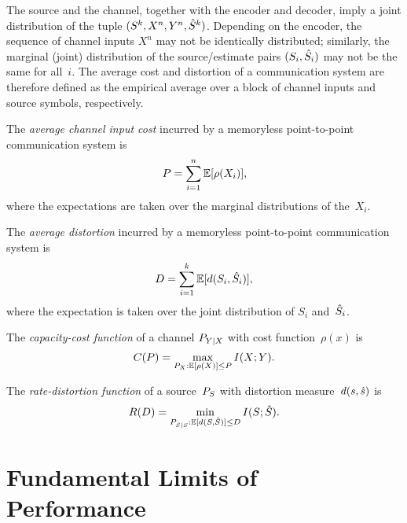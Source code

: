 The source and the channel, together with the encoder and decoder, imply a joint
distribution of the tuple $(S^k, X^n, Y^n, {\hat{S}}^k)$.  Depending on the encoder,
the sequence of channel inputs $X^n$ may not be identically distributed;
similarly, the marginal (joint) distribution of the source/estimate pairs
$(S_i,{\hat{S}}_i)$ may not be the same for all~$i$. The average cost and distortion
of a communication system are therefore defined as the empirical average over
a block of channel inputs and source symbols, respectively.

\begin{definition}
  \label{def:avgcost}
  The \emph{average channel input cost} incurred by a memoryless point-to-point
  communication system is
  \begin{equation*}
    P = \sum_{i=1}^n \mathbb{E}[\rho(X_i)],
  \end{equation*}
  where the expectations are taken over the marginal distributions of the~$X_i$.
\end{definition}

\begin{definition}
  \label{def:avgdist}
  The \emph{average distortion} incurred by a memoryless point-to-point
  communication system is
  \begin{equation*}
    D = \sum_{i=1}^k \mathbb{E}[d(S_i, {\hat{S}}_i)],
  \end{equation*}
  where the expectation is taken over the joint distribution of $S_i$
  and~${\hat{S}}_i$.
\end{definition}

\begin{definition}
  \label{def:capacity}
  The \emph{capacity-cost function} of a channel $P_{Y|X}$ with cost
  function~$\rho(x)$ is
  \begin{equation*}
    C(P) = \max_{P_X: \mathbb{E}[\rho(X)] \le P} I(X;Y).
  \end{equation*}
\end{definition}

\begin{definition}
  \label{def:ratedistortion}
  The \emph{rate-distortion function} of a source~${P_S}$ with distortion
  measure~$d(s,{\hat{s}})$ is 
  \begin{equation*}
    R(D) = \min_{P_{{\hat{S}}|S}: \mathbb{E}[d(S,{\hat{S}})] \le D} I(S;{\hat{S}}).
  \end{equation*}
\end{definition}


\section{Fundamental Limits of Performance}\label{sec:fundamentallimits}

